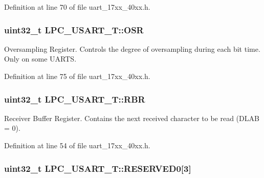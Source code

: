 Definition at line 70 of file uart\+\_\+17xx\+\_\+40xx.\+h.

\subsubsection[{\texorpdfstring{O\+SR}{OSR}}]{ uint32\+\_\+t L\+P\+C\+\_\+\+U\+S\+A\+R\+T\+\_\+\+T\+::\+O\+SR}\hypertarget{structLPC__USART__T_abd99c522dd0ccec4b7c7b1c08cc3c1fb}{}\label{structLPC__USART__T_abd99c522dd0ccec4b7c7b1c08cc3c1fb}
Oversampling Register. Controls the degree of oversampling during each bit time. Only on some U\+A\+R\+TS. 

Definition at line 75 of file uart\+\_\+17xx\+\_\+40xx.\+h.

\subsubsection[{\texorpdfstring{R\+BR}{RBR}}]{ uint32\+\_\+t L\+P\+C\+\_\+\+U\+S\+A\+R\+T\+\_\+\+T\+::\+R\+BR}\hypertarget{structLPC__USART__T_a39191d418ae7de55f62202f25fd29083}{}\label{structLPC__USART__T_a39191d418ae7de55f62202f25fd29083}
Receiver Buffer Register. Contains the next received character to be read (D\+L\+AB = 0). 

Definition at line 54 of file uart\+\_\+17xx\+\_\+40xx.\+h.

\subsubsection[{\texorpdfstring{R\+E\+S\+E\+R\+V\+E\+D0}{RESERVED0}}]{\setlength{\rightskip}{0pt plus 5cm}uint32\+\_\+t L\+P\+C\+\_\+\+U\+S\+A\+R\+T\+\_\+\+T\+::\+R\+E\+S\+E\+R\+V\+E\+D0\mbox{[}3\mbox{]}}\hypertarget{structLPC__USART__T_af3789f39fe00cc53f3055507eb9eb52c}{}\label{structLPC__USART__T_af3789f39fe00cc53f3055507eb9eb52c}


